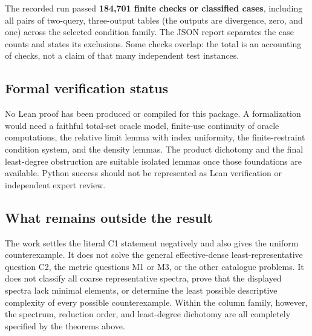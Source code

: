 \documentclass[11pt,a4paper]{article}
\theoremstyle{definition}\newtheorem{definition}[theorem]{Definition}
\theoremstyle{remark}\newtheorem{remark}[theorem]{Remark}
\begin{document}
The recorded run passed \textbf{184,701 finite checks or classified cases}, including all pairs of two-query, three-output tables (the outputs are divergence, zero, and one) across the selected condition family. The JSON report separates the case counts and states its exclusions. Some checks overlap: the total is an accounting of checks, not a claim of that many independent test instances.

\subsection{Formal verification status}
No Lean proof has been produced or compiled for this package. A formalization would need a faithful total-set oracle model, finite-use continuity of oracle computations, the relative limit lemma with index uniformity, the finite-restraint condition system, and the density lemmas. The product dichotomy and the final least-degree obstruction are suitable isolated lemmas once those foundations are available. Python success should not be represented as Lean verification or independent expert review.

\subsection{What remains outside the result}
The work settles the literal C1 statement negatively and also gives the uniform counterexample. It does not solve the general effective-dense least-representative question C2, the metric questions M1 or M3, or the other catalogue problems. It does not classify all coarse representative spectra, prove that the displayed spectra lack minimal elements, or determine the least possible descriptive complexity of every possible counterexample. Within the column family, however, the spectrum, reduction order, and least-degree dichotomy are all completely specified by the theorems above.

\appendix
\end{document}
